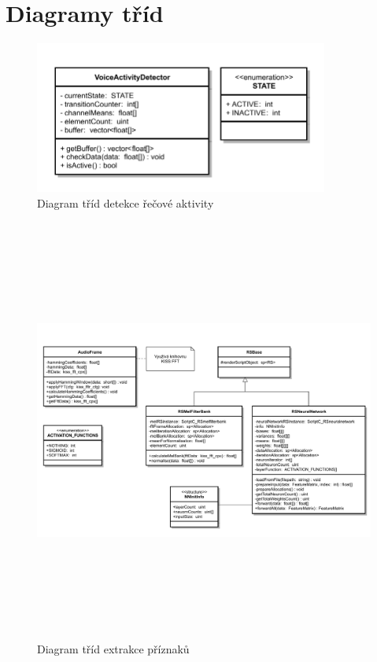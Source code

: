 \chapter{Diagramy tříd}\label{app:class_diag}
\begin{figure}[H]\label{app:voice_activity_detection}
	\centering
		\includegraphics[height=5cm]{obrazky-figures/classdiagram_voiceactivitydetection.pdf}
        \caption{Diagram tříd detekce řečové aktivity}
\end{figure}
\begin{figure}[H]\label{app:feature_extraction}
	\centering
		\includegraphics[height=14cm, angle=90]{obrazky-figures/classdiagram_featureextraction.pdf}
        \caption{Diagram tříd extrakce příznaků}
\end{figure}
